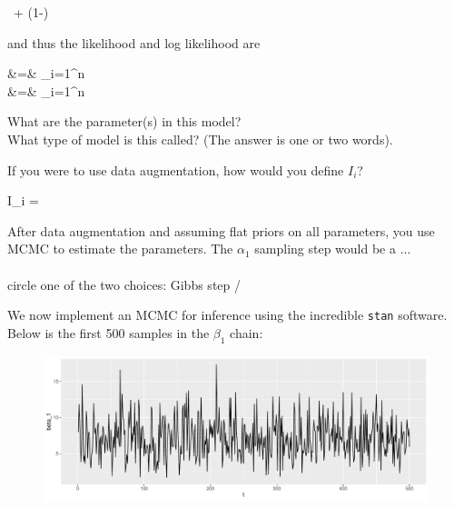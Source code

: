 \documentclass[12pt]{article}
\begin{document}
\beqn
\Xoneton \iid \theta \, + (1-\theta) \,
\eeqn 

\noindent and thus the likelihood and log likelihood are

\beqn
{} &=& \prod_{i=1}^n  \\
\ell &=& \sum_{i=1}^n 
\eeqn

\begin{enumerate}
 What are the parameter(s) in this model?\\

 What type of model is this called? (The answer is one or two words).\\


 If you were to use data augmentation, how would you define $I_i$?

\beqn
\hspace{-1.5cm}I_i = 
\eeqn 

 After data augmentation and assuming flat priors on all parameters, you use MCMC to estimate the parameters. The $\alpha_1$ sampling step would be a ...  \\~\\ circle one of the two choices: Gibbs step / 


We now implement an MCMC for inference using the incredible \texttt{stan} software. Below is the first 500 samples in the $\beta_1$ chain:

\begin{figure}[htp]
\centering
\includegraphics[width=6in]{beta_1}
\end{figure}


\end{enumerate}
\end{document}
